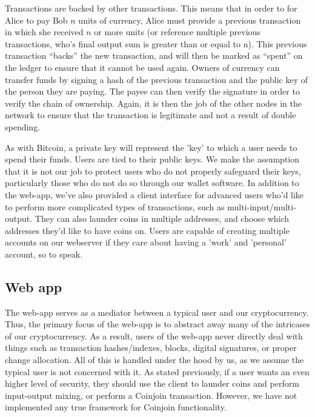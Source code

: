 \documentclass[12pt]{article}
\begin{document}
Transactions are backed by other transactions. This means that in order to for Alice to pay Bob $n$ units of currency, Alice must provide a previous transaction in which she received $n$ or more units (or reference multiple previous transactions, who's final output sum is greater than or equal to n). This previous transaction ``backs'' the new transaction, and will then be marked as ``spent'' on the ledger to ensure that it cannot be used again. Owners of currency can transfer funds by signing a hash of the previous transaction and the public key of the person they are paying. The payee can then verify the signature in order to verify the chain of ownership. Again, it is then the job of the other nodes in the network to ensure that the transaction is legitimate and not a result of double spending.

As with Bitcoin, a private key will represent the 'key' to which a user needs to spend their funds. Users are tied to their public keys. We make the assumption that it is not our job to protect users who do not properly safeguard their keys, particularly those who do not do so through our wallet software. In addition to the web-app, we've also provided a client interface for advanced users who'd like to perform more complicated types of transactions, such as multi-input/multi-output. They can also launder coins in multiple addresses, and choose which addresses they'd like to have coins on. Users are capable of creating multiple accounts on our webserver if they care about having a 'work' and 'personal' account, so to speak.

\subsection*{Web app}

The web-app serves as a mediator between a typical user and our cryptocurrency. Thus, the primary focus of the web-app is to abstract away many of the intricases of our cryptocurrency. As a result, users of the web-app never directly deal with things such as transaction hashes/indexes, blocks, digital signatures, or proper change allocation. All of this is handled under the hood by us, as we assume the typical user is not concerned with it. As stated previously, if a user wants an even higher level of security, they should use the client to launder coins and perform input-output mixing, or perform a Coinjoin transaction. However, we have not implemented any true framework for Coinjoin functionality. 
\end{document}

